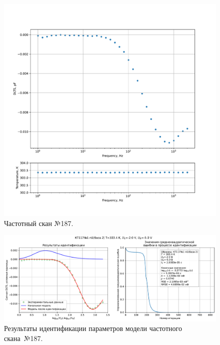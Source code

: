 \begin{figure}[!ht]
    \centering
    \includegraphics[width=1\textwidth]{../plots/КТ117№1_п1(база 2)_2500Гц-1Гц_1пФ_+30С_-2В-5В_200мВ_20мкс_шаг_0,1.pdf}
    \caption{Частотный скан №187.}
    \label{pic:frequency_scan_187}
\end{figure}

\begin{figure}[!ht]
    \centering
    \includegraphics[width=1\textwidth]{../plots/КТ117№1_п1(база 2)_2500Гц-1Гц_1пФ_+30С_-2В-5В_200мВ_20мкс_шаг_0,1_model.pdf}
    \caption{Результаты идентификации параметров модели частотного скана~№187.}
    \label{pic:frequency_scan_model187}
\end{figure}

\pagebreak


